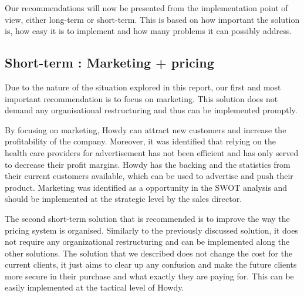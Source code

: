 Our recommendations will now be presented from the implementation point of view, either long-term or short-term. This is based on how important the solution is, how easy it is to implement and how many problems it can possibly address.



\subsection{Short-term : Marketing + pricing}
Due to the nature of the situation explored in this report, our first and most important recommendation is to focus on marketing. This solution does not demand any organisational restructuring and thus can be implemented promptly.

\noindent By focusing on marketing, Howdy can attract new customers and increase the profitability of the company. Moreover, it was identified that relying on the health care providers for advertisement has not been efficient and has only served to decrease their profit margins. Howdy has the backing and the statistics from their current customers available, which can be used to advertise and push their product. Marketing was identified as a opportunity in the SWOT analysis and should be implemented at the strategic level by the sales director.

\noindent The second short-term solution that is recommended is to improve the way the pricing system is organised. Similarly to the previously discussed solution, it does not require any organizational restructuring and can be implemented along the other solutions. The solution that we described does not change the cost for the current clients, it just aims to clear up any confusion and make the future clients more secure in their purchase and what exactly they are paying for. This can be easily implemented at the tactical level of Howdy. 


